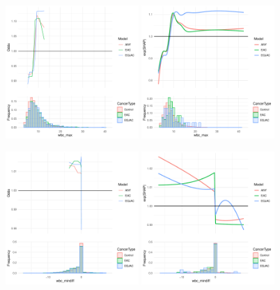 \documentclass[12pt]{article}
\begin{document}
\begin{figure}[h]
\centering
\includegraphics[width=0.45\textwidth]{pdp/wbc_max.pdf}
\includegraphics[width=0.45\textwidth]{shap/wbc_max.pdf}
\end{figure}
\begin{figure}[h]
\centering
\includegraphics[width=0.45\textwidth]{pdp/wbc_mindiff.pdf}
\includegraphics[width=0.45\textwidth]{shap/wbc_mindiff.pdf}
\end{figure}
\end{document}
